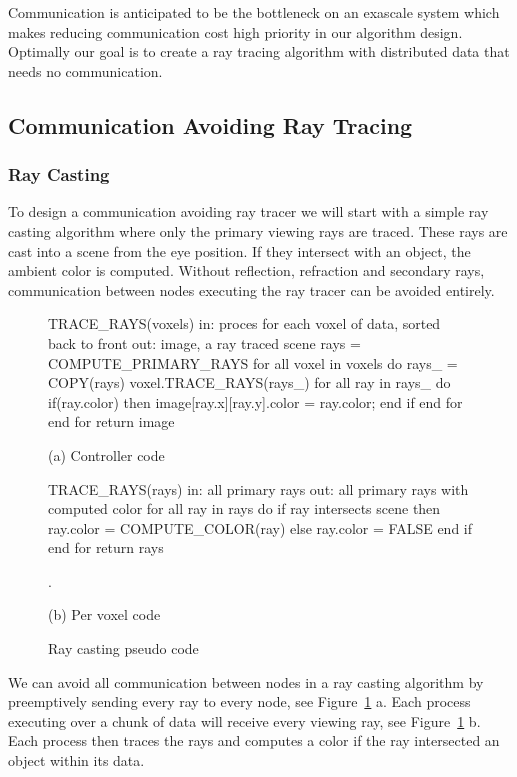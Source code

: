 Communication is anticipated to be the bottleneck on an exascale system which
makes reducing communication cost high priority in our algorithm design.  
Optimally our goal is to create a ray tracing algorithm with distributed data 
that needs no communication.

\subsection{Communication Avoiding Ray Tracing}
\subsubsection{Ray Casting}
To design a communication avoiding ray tracer we will start with a simple ray
casting algorithm where only the primary viewing rays are traced. These rays are 
cast into a scene from the eye position.  If they intersect with an object, the 
ambient color is computed.  Without reflection, refraction and secondary rays,
communication between nodes executing the ray tracer can be avoided entirely.

\begin{figure}[!htb]
\begin{algorithm}
TRACE_RAYS(voxels) 
  in: proces for each voxel of 
      data, sorted back to front
  out: image, a ray traced scene
  rays = COMPUTE_PRIMARY_RAYS
  for all voxel in voxels do
  rays_ = COPY(rays)
    voxel.TRACE_RAYS(rays_)
    for all ray in rays_ do
      if(ray.color) then
        image[ray.x][ray.y].color
         = ray.color;
      end if
    end for
  end for
return image
\end{algorithm}

(a) Controller code

\endminipage\hfill
{}
\begin{algorithm}
TRACE_RAYS(rays)
  in:  all primary rays
  out: all primary rays with 
       computed color
  for all ray in rays do
    if ray intersects scene then
      ray.color = COMPUTE_COLOR(ray)
    else
      ray.color = FALSE
    end if
  end for
return rays



.
\end{algorithm}

(b) Per voxel code

\endminipage\hfill
\caption{Ray casting pseudo code}
\label{fig:ray_caster}
\end{figure}

We can avoid all communication between nodes in a ray casting algorithm by 
preemptively sending every ray to every node, see Figure~\ref{fig:ray_caster} a.  
Each process executing over a chunk of data will receive every viewing ray, see 
Figure~\ref{fig:ray_caster} b.  Each process then traces the rays and computes a
color if the ray intersected an object within its data.  

